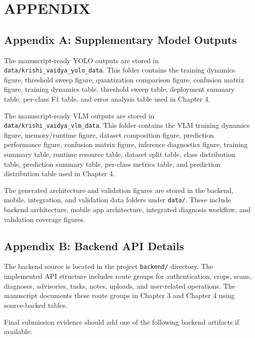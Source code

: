 \chapter*{APPENDIX}

\section*{Appendix A: Supplementary Model Outputs}

The manuscript-ready YOLO outputs are stored in
\texttt{data/krishi\_vaidya\_yolo\_data}. This folder contains the training dynamics figure,
threshold sweep figure, quantization comparison figure, confusion matrix figure, training
dynamics table, threshold sweep table, deployment summary table, per-class F1 table, and error
analysis table used in Chapter 4.

The manuscript-ready VLM outputs are stored in
\texttt{data/krishi\_vaidya\_vlm\_data}. This folder contains the VLM training dynamics figure,
memory/runtime figure, dataset composition figure, prediction performance figure, confusion
matrix figure, inference diagnostics figure, training summary table, runtime resource table,
dataset split table, class distribution table, prediction summary table, per-class metrics table,
and prediction distribution table used in Chapter 4.

The generated architecture and validation figures are stored in the backend, mobile,
integration, and validation data folders under \texttt{data/}. These include backend
architecture, mobile app architecture, integrated diagnosis workflow, and validation coverage
figures.

\section*{Appendix B: Backend API Details}

The backend source is located in the project \texttt{backend/} directory. The implemented API
structure includes route groups for authentication, crops, scans, diagnoses, advisories, tasks,
notes, uploads, and user-related operations. The manuscript documents these route groups in
Chapter 3 and Chapter 4 using source-backed tables.

Final submission evidence should add one of the following backend artifacts if available:

